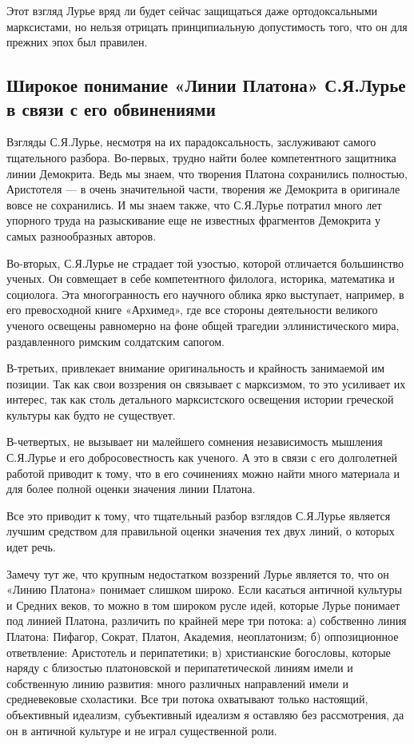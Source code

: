 Этот взгляд Лурье вряд ли будет сейчас защищаться даже ортодоксальными
марксистами, но нельзя отрицать  принципиальную допустимость того, что
он для прежних эпох был правилен.

\subsection{Широкое понимание «Линии Платона»  С.Я.Лурье в связи с его
обвинениями}

Взгляды С.Я.Лурье, несмотря на их парадоксальность, заслуживают самого
тщательного  разбора.  Во-первых,  трудно  найти  более  компетентного
защитника  линии  Демокрита.  Ведь  мы  знаем,  что  творения  Платона
сохранились  полностью, Аристотеля  ---  в  очень значительной  части,
творения же  Демокрита в  оригинале вовсе не  сохранились. И  мы знаем
также, что С.Я.Лурье потратил много лет упорного труда на разыскивание
еще не известных фрагментов Демокрита у самых разнообразных авторов.

Во-вторых,  С.Я.Лурье  не  страдает той  узостью,  которой  отличается
большинство  ученых.  Он  совмещает  в  себе  компетентного  филолога,
историка,  математика и  социолога.  Эта  многогранность его  научного
облика ярко  выступает, например, в его  превосходной книге «Архимед»,
где все  стороны деятельности великого ученого  освещены равномерно на
фоне  общей  трагедии  эллинистического  мира,  раздавленного  римским
солдатским сапогом.

В-третьих, привлекает  внимание оригинальность и  крайность занимаемой
им позиции. Так  как свои воззрения он связывает с  марксизмом, то это
усиливает их интерес, так как столь детального марксистского освещения
истории греческой культуры как будто не существует.

В-четвертых, не вызывает ни  малейшего сомнения независимость мышления
С.Я.Лурье и  его добросовестность  как ученого.  А это  в связи  с его
долголетней работой приводит к тому,  что в его сочинениях можно найти
много материала и для более полной оценки значения линии Платона.

Все  это приводит  к тому,  что тщательный  разбор взглядов  С.Я.Лурье
является  лучшим средством  для  правильной оценки  значения тех  двух
линий, о которых идет речь.

Замечу  тут  же,  что  крупным недостатком  воззрений  Лурье  является
то,  что он  «Линию Платона»  понимает слишком  широко. Если  касаться
античной  культуры и  Средних  веков,  то можно  в  том широком  русле
идей,  которые  Лурье  понимает   под  линией  Платона,  различить  по
крайней  мере  три  потока:  а)  собственно  линия  Платона:  Пифагор,
Сократ, Платон, Академия,  неоплатонизм; б) оппозиционное ответвление:
Аристотель и перипатетики; в) христианские богословы, которые наряду с
близостью платоновской  и перипатетической линиям имели  и собственную
линию  развития: много  различных  направлений  имели и  средневековые
схоластики. Все  три потока  охватывают только  настоящий, объективный
идеализм, субъективный идеализм  я оставляю без рассмотрения,  да он в
античной культуре и не играл существенной роли.

